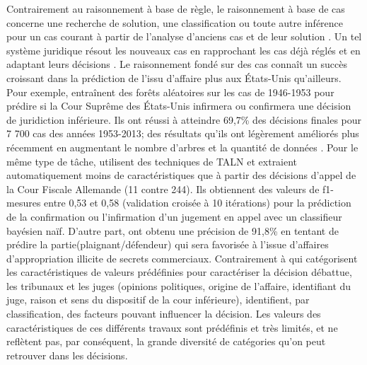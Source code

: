 Contrairement au raisonnement à base de règle, le raisonnement à base de cas concerne une recherche de solution, une classification ou toute autre inférence pour un cas courant à partir de l'analyse d'anciens cas et de leur solution \citep{moens2002case-basedreasoning}. Un tel système juridique résout les nouveaux cas en rapprochant les cas déjà réglés et en adaptant leurs décisions \citep{Berka2011rbr-cbr}. Le raisonnement fondé sur des cas connaît un succès croissant dans la prédiction de l'issu d'affaire plus aux États-Unis qu'ailleurs. Pour exemple, \citet{katz2014predicting} entraînent des forêts aléatoires sur les cas de 1946-1953 pour prédire si la Cour Suprême des États-Unis infirmera ou confirmera une décision de juridiction inférieure. Ils ont réussi à atteindre 69,7\% des décisions finales pour 7 700 cas des années 1953-2013; des résultats qu'ils ont légèrement améliorés plus récemment en augmentant le nombre d'arbres et la quantité de données \citep{katz2017predictsupremecourt}. Pour le même type de tâche, \citet{waltl2017predictgermantaxlaw} utilisent des techniques de TALN et extraient automatiquement moins de caractéristiques que \citep{katz2014predicting}  à partir des décisions d'appel de la Cour Fiscale Allemande (11 contre 244). Ils obtiennent des valeurs de f1-mesures entre 0,53 et 0,58 (validation croisée à 10 itérations) pour la prédiction  de la confirmation ou l'infirmation d'un jugement en appel avec un classifieur bayésien naïf.  D'autre part, \cite{Ashley2009classifCases} ont obtenu une précision de 91,8\% en tentant de prédire la partie(plaignant/défendeur)  qui sera favorisée  à l'issue d'affaires d'appropriation illicite de secrets commerciaux. Contrairement à \citep{katz2014predicting} qui catégorisent les caractéristiques de valeurs prédéfinies pour caractériser la décision débattue, les tribunaux et les juges (opinions politiques, origine de l'affaire, identifiant du juge, raison et sens du dispositif de la cour inférieure), \cite{Ashley2009classifCases} identifient, par classification, des facteurs pouvant influencer la décision. Les valeurs des caractéristiques de ces différents travaux sont prédéfinis et très limités, et ne reflètent pas, par conséquent, la grande diversité de catégories qu'on peut retrouver dans les décisions. 

